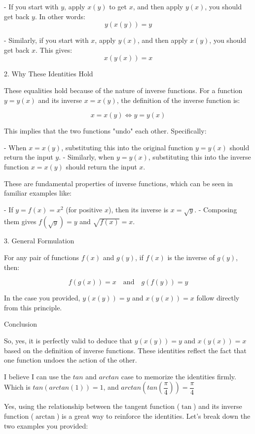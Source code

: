 \documentclass[a4paper,12pt]{book}
\begin{document}
- If you start with \( y \), apply \( x(y) \) to get \( x \), and then apply \( y(x) \), you should get back \( y \). In other words:
\[
y(x(y)) = y
\]

- Similarly, if you start with \( x \), apply \( y(x) \), and then apply \( x(y) \), you should get back \( x \). This gives:
\[
x(y(x)) = x
\]

2. Why These Identities Hold

These equalities hold because of the nature of inverse functions. For a function \( y = y(x) \) and its inverse \( x = x(y) \), the definition of the inverse function is:

\[
x = x(y) \iff y = y(x)
\]

This implies that the two functions "undo" each other. Specifically:

- When \( x = x(y) \), substituting this into the original function \( y = y(x) \) should return the input \( y \).
- Similarly, when \( y = y(x) \), substituting this into the inverse function \( x = x(y) \) should return the input \( x \).

These are fundamental properties of inverse functions, which can be seen in familiar examples like:

- If \( y = f(x) = x^2 \) (for positive \( x \)), then its inverse is \( x = \sqrt{y} \).
- Composing them gives \( f(\sqrt{y}) = y \) and \( \sqrt{f(x)} = x \).

3. General Formulation

For any pair of functions \( f(x) \) and \( g(y) \), if \( f(x) \) is the inverse of \( g(y) \), then:

\[
f(g(x)) = x \quad \text{and} \quad g(f(y)) = y
\]

In the case you provided, \( y(x(y)) = y \) and \( x(y(x)) = x \) follow directly from this principle.

Conclusion

So, yes, it is perfectly valid to deduce that \( y(x(y)) = y \) and \( x(y(x)) = x \) based on the definition of inverse functions. These identities reflect the fact that one function undoes the action of the other.

\begin{bluebox}
I believe I can use the \(tan\) and \(arctan\) case to memorize the identities firmly. Which is \(tan(arctan(1))=1\), and \(arctan(tan(\dfrac{\pi}{4}))= \dfrac{\pi}{4}\)
\end{bluebox}
Yes, using the relationship between the tangent function (\(\tan\)) and its inverse function (\(\arctan\)) is a great way to reinforce the identities. Let's break down the two examples you provided:
\end{document}
